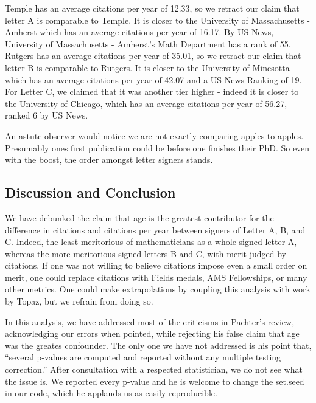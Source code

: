 \documentclass[]{article}
\begin{document}
Temple has an average citations per year of 12.33, so we retract our
claim that letter A is comparable to Temple. It is closer to the
University of Massachusetts - Amherst which has an average citations per
year of 16.17. By
\href{https://www.usnews.com/best-graduate-schools/top-science-schools/mathematics-rankings}{US
News}, University of Massachusetts - Amherst's Math Department has a
rank of 55. Rutgers has an average citations per year of 35.01, so we
retract our claim that letter B is comparable to Rutgers. It is closer
to the University of Minesotta which has an average citations per year
of 42.07 and a US News Ranking of 19. For Letter C, we claimed that it
was another tier higher - indeed it is closer to the University of
Chicago, which has an average citations per year of 56.27, ranked 6 by
US News.

An astute observer would notice we are not exactly comparing apples to
apples. Presumably ones first publication could be before one finishes
their PhD. So even with the boost, the order amongst letter signers
stands.

\hypertarget{discussion-and-conclusion}{%
\subsection{Discussion and Conclusion}\label{discussion-and-conclusion}}

We have debunked the claim that age is the greatest contributor for the
difference in citations and citations per year between signers of Letter
A, B, and C. Indeed, the least meritorious of mathematicians as a whole
signed letter A, whereas the more meritorious signed letters B and C,
with merit judged by citations. If one was not willing to believe
citations impose even a small order on merit, one could replace
citations with Fields medals, AMS Fellowships, or many other metrics.
One could make extrapolations by coupling this analysis with work by
Topaz, but we refrain from doing so.

In this analysis, we have addressed most of the criticisms in Pachter's
review, acknowledging our errors when pointed, while rejecting his false
claim that age was the greates confounder. The only one we have not
addressed is his point that, ``several p-values are computed and
reported without any multiple testing correction.'' After consultation
with a respected statistician, we do not see what the issue is. We
reported every p-value and he is welcome to change the set.seed in our
code, which he applauds us as easily reproducible.
\end{document}
